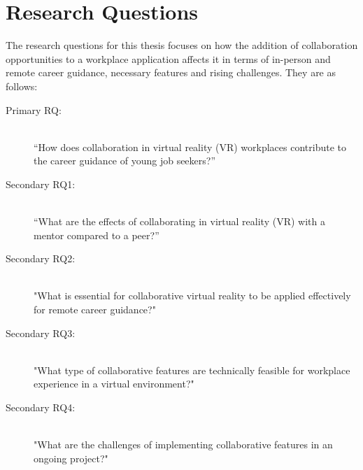 \section{Research Questions}
The research questions for this thesis focuses on how the addition of collaboration opportunities to a workplace application affects it in terms of in-person and remote career guidance, necessary features and rising challenges. They are as follows:
\label{RQ}
\begin{description}
    \item [Primary RQ:]\hfill \\
    “How does collaboration in virtual reality (VR) workplaces contribute to the career guidance of young job seekers?” 
    \item [Secondary RQ1:]\hfill \\
    “What are the effects of collaborating in virtual reality (VR) with a mentor compared to a peer?”
    \item [Secondary RQ2:]\hfill \\
    "What is essential for collaborative virtual reality to be applied effectively for remote career guidance?"
    \item [Secondary RQ3:]\hfill \\
    "What type of collaborative features are technically feasible for workplace experience in a virtual environment?"
    \item  [Secondary RQ4:]\hfill \\
    "What are the challenges of implementing collaborative features in an ongoing project?"
\end{description}





\cleardoublepage
